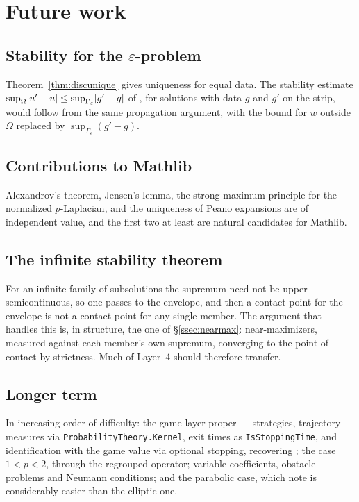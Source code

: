 \documentclass[11pt,reqno]{amsart}
\newcommand{\LEANREF}[1]{\texttt{\small\def\_{\textunderscore\allowbreak}#1}}
\newcommand{\eps}{\varepsilon}
\DeclarePairedDelimiter{\abs}{\lvert}{\rvert}
\theoremstyle{plain}
\theoremstyle{definition}
\begin{document}
\section{Future work}\label{sec:future}

\subsection{Stability for the \texorpdfstring{$\eps$}{epsilon}-problem}

Theorem~\ref{thm:discunique} gives uniqueness for equal data. The stability
estimate $\sup_\Omega\abs{u' - u} \le \sup_{\Gamma_\eps}\abs{g' - g}$ of
\cite[Theorem~2.2]{LPS14}, for solutions with data $g$ and $g'$ on the strip,
would follow from the same propagation argument, with the bound for $w$ outside
$\Omega$ replaced by $\sup_{\Gamma_\eps}(g' - g)$.

\subsection{Contributions to Mathlib}

Alexandrov's theorem, Jensen's lemma, the strong maximum principle for the
normalized $p$-Laplacian, and the uniqueness of Peano expansions are of
independent value, and the first two at least are natural candidates for
Mathlib.

\subsection{The infinite stability theorem}

For an infinite family of subsolutions the supremum need not be upper
semicontinuous, so one passes to the envelope, and then a contact point for the
envelope is not a contact point for any single member. The argument that
handles this is, in structure, the one of \S\ref{ssec:nearmax}: near-maximizers,
measured against each member's own supremum, converging to the point of contact
by strictness. Much of Layer~4 should therefore transfer.

\subsection{Longer term}

In increasing order of difficulty: the game layer proper --- strategies,
trajectory measures via \LEANREF{ProbabilityTheory.Kernel}, exit times as
\LEANREF{IsStoppingTime}, and identification with the game value via optional
stopping, recovering \cite[Thm.~3.2]{LPS14}; the case $1 < p < 2$, through the
regrouped operator; variable coefficients, obstacle problems and Neumann
conditions; and the parabolic case, which \cite[\S5]{LPS14} note is
considerably easier than the elliptic one.
\end{document}
